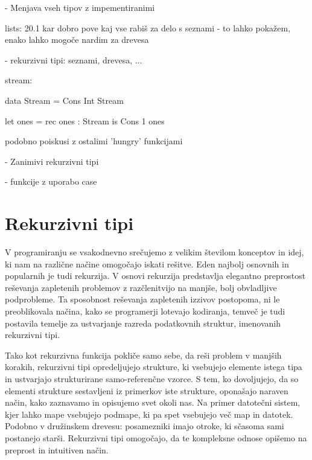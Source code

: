 \documentclass[a4paper]{report}
\begin{document}
- Menjava vseh tipov z impementiranimi

lists: 20.1 kar dobro pove kaj vse rabiš za delo s seznami - to lahko pokažem, enako lahko mogoče nardim za drevesa

- rekurzivni tipi: seznami, drevesa, ...

stream:

data Stream = Cons Int Stream

let ones = rec ones : Stream is Cons 1 ones

podobno poiskusi z ostalimi 'hungry' funkcijami

- Zanimivi rekurzivni tipi

- funkcije z uporabo case


\newpage
\section{Rekurzivni tipi} %
V programiranju se vsakodnevno srečujemo z velikim številom konceptov in idej, ki nam na različne načine omogočajo iskati rešitve. Eden najbolj osnovnih in popularnih je tudi rekurzija.
V osnovi rekurzija predstavlja elegantno preprostost reševanja zapletenih problemov z razčlenitvijo na manjše, bolj obvladljive podprobleme. Ta sposobnost reševanja zapletenih izzivov 
postopoma, ni le preoblikovala načina, kako se programerji lotevajo kodiranja, temveč je tudi postavila temelje za ustvarjanje razreda podatkovnih struktur, imenovanih rekurzivni tipi.

Tako kot rekurzivna funkcija pokliče samo sebe, da reši problem v manjših korakih, rekurzivni tipi opredeljujejo strukture, ki vsebujejo elemente istega tipa in ustvarjajo strukturirane 
samo-referenčne vzorce. S tem, ko dovoljujejo, da so elementi strukture sestavljeni iz primerkov iste strukture, oponašajo naraven način, kako zaznavamo in opisujemo svet okoli nas. 
Na primer datotečni sistem, kjer lahko mape vsebujejo podmape, ki pa spet vsebujejo več map in datotek. Podobno v družinskem drevesu: posamezniki imajo otroke, ki sčasoma sami 
postanejo starši. Rekurzivni tipi omogočajo, da te kompleksne odnose opišemo na preprost in intuitiven način.
\end{document}
